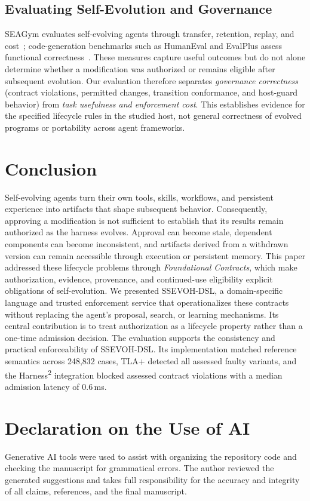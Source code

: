\documentclass[letterpaper,journal]{IEEEtran}
\newcommand{\tool}{SSEVOH-DSL}
\newcommand{\harness}{Harness\textsuperscript{2}}
\begin{document}
\subsection{Evaluating Self-Evolution and Governance}
SEAGym evaluates self-evolving agents through transfer, retention, replay, and cost~\cite{seagym}; code-generation benchmarks such as HumanEval and EvalPlus assess functional correctness~\cite{humaneval,evalplus}. These measures capture useful outcomes but do not alone determine whether a modification was authorized or remains eligible after subsequent evolution. Our evaluation therefore separates \emph{governance correctness} (contract violations, permitted changes, transition conformance, and host-guard behavior) from \emph{task usefulness and enforcement cost}. This establishes evidence for the specified lifecycle rules in the studied host, not general correctness of evolved programs or portability across agent frameworks.








\section{Conclusion}\label{sec:conclusion}
Self-evolving agents turn their own tools, skills, workflows, and persistent experience into artifacts that shape subsequent behavior. Consequently, approving a modification is not sufficient to establish that its results remain authorized as the harness evolves. Approval can become stale, dependent components can become inconsistent, and artifacts derived from a withdrawn version can remain accessible through execution or persistent memory. This paper addressed these lifecycle problems through \emph{Foundational Contracts}, which make authorization, evidence, provenance, and continued-use eligibility explicit obligations of self-evolution. We presented \tool{}, a domain-specific language and trusted enforcement service that operationalizes these contracts without replacing the agent's proposal, search, or learning mechanisms. Its central contribution is to treat authorization as a lifecycle property rather than a one-time admission decision. The evaluation supports the consistency and practical enforceability of \tool{}. Its implementation matched reference semantics across 248,832 cases, TLA+ detected all assessed faulty variants, and the \harness{} integration blocked assessed contract violations with a median admission latency of 0.6\,ms.




\section*{Declaration on the Use of AI}
Generative AI tools were used to assist with organizing the repository code and checking the manuscript for grammatical errors. The author reviewed the generated suggestions and takes full responsibility for the accuracy and integrity of all claims, references, and the final manuscript.


\balance

\end{document}
